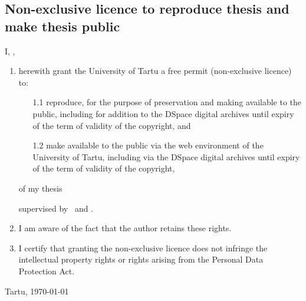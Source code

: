 \begin{appendices}
{{%

\subsection*{Non-exclusive licence to reproduce thesis and make thesis public}

I, \textbf{\Author},

\begin{enumerate}
\item
herewith grant the University of Tartu a free permit (non-exclusive licence) to:
\begin{enumerate}
\item[1.1]
reproduce, for the purpose of preservation and making available to the public, including for addition to the DSpace digital archives until expiry of the term of validity of the copyright, and
\item[1.2]
make available to the public via the web environment of the University of Tartu, including via the DSpace digital archives until expiry of the term of validity of the copyright,
\end{enumerate}

of my thesis

\textbf{\topic}

supervised by \SupervisorName\ and \CosupervisorName.

\item
I am aware of the fact that the author retains these rights.
\item
I certify that granting the non-exclusive licence does not infringe the intellectual property rights or rights arising from the Personal Data Protection Act.
\end{enumerate}


Tartu, \today
}}%


\newcommand\EstLicence{{%
\selectlanguage{estonian}
\section*{II. Litsents}

\addcontentsline{toc}{subsection}{II. Litsents}

\subsection*{\topic}

Mina, \textbf{\Author},

}}
\end{appendices}
